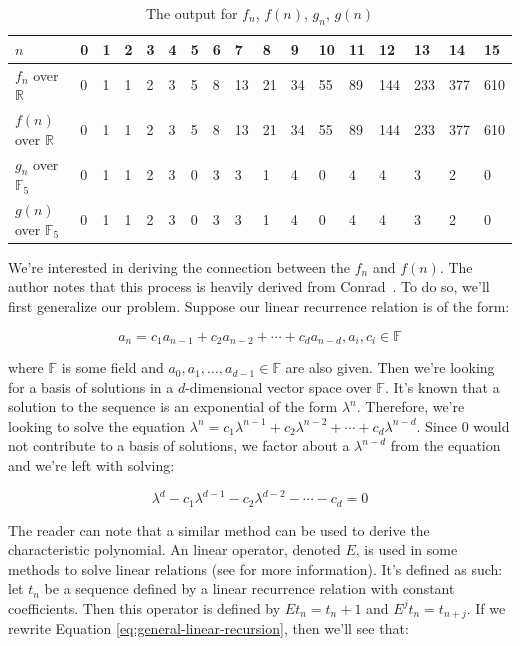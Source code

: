 \documentclass[a4paper]{article}
\theoremstyle{definition}
\begin{document}
\begin{table}[ht]
\centering
\begin{tabular}{|l|l|l|l|l|l|l|l|l|l|l|l|l|l|l|l|l|}
\hline
$n$ & 0 & 1 & 2 & 3 & 4 & 5 & 6 & 7 & 8 & 9 & 10 & 11 & 12 & 13 & 14 & 15 \\ \hline
$f_n$ over $\mathbb{R}$ & 0 & 1 & 1 & 2 & 3 & 5 & 8 & 13 & 21 & 34 & 55 & 89 & 144 & 233 & 377 & 610 \\ \hline
$f(n)$ over $\mathbb{R}$ & 0 & 1 & 1 & 2 & 3 & 5 & 8 & 13 & 21 & 34 & 55 & 89 & 144 & 233 & 377 & 610 \\ \hline
$g_n$ over $\mathbb{F}_5$ & 0 & 1 & 1 & 2 & 3 & 0 & 3 & 3 & 1 & 4 & 0 & 4 & 4 & 3 & 2 & 0 \\ \hline
$g(n)$ over $\mathbb{F}_5$ & 0 & 1 & 1 & 2 & 3 & 0 & 3 & 3 & 1 & 4 & 0 & 4 & 4 & 3 & 2 & 0 \\ \hline
\end{tabular}
\caption{The output for $f_n$, $f(n)$, $g_n$, $g(n)$}
\label{tab:fib-output}
\end{table}

We're interested in deriving the connection between the $f_n$ and $f(n)$. The author notes that this
process is heavily derived from Conrad~\cite{bib:solve-lin-rec-field}. To do so, we'll first generalize
our problem. Suppose our linear recurrence relation is of the form:

\begin{equation}
a_n=c_1a_{n-1}+c_2a_{n-2}+\cdots+c_{d}a_{n-d}, a_i, c_i \in \mathbb{F}
\label{eq:general-linear-recursion}
\end{equation}

where $\mathbb{F}$ is some field and $a_0, a_1, \ldots, a_{d-1} \in \mathbb{F}$ are also given. Then
we're looking for a basis of solutions in a $d$-dimensional vector space over $\mathbb{F}$. It's known
that a solution to the sequence is an exponential of the form $\lambda^n$\cite{bib:solve-lin-rec-field}.
Therefore, we're looking to solve the equation
$\lambda^n=c_1\lambda^{n-1}+c_2\lambda^{n-2}+\cdots+c_d\lambda^{n-d}$. Since $0$ would not contribute to
a basis of solutions, we factor about a $\lambda^{n-d}$ from the equation and we're left with solving:

\begin{equation}
\lambda^d-c_1\lambda^{d-1}-c_2\lambda^{d-2}-\cdots-c_d=0
\label{eq:char-poly}
\end{equation}

The reader can note that a similar method can be used to derive the characteristic polynomial. An linear
operator, denoted $E$, is used in some methods to solve linear relations (see
\cite{bib:successor-explained} for more information). It's defined as such: let $t_n$ be a sequence
defined by a linear recurrence relation with constant coefficients. Then this operator is defined by
$Et_n=t_n+1$ and $E^{j}t_n=t_{n+j}$\cite{bib:gen_cond_rec}. If we rewrite Equation
\ref{eq:general-linear-recursion}, then we'll see that:
\end{document}
